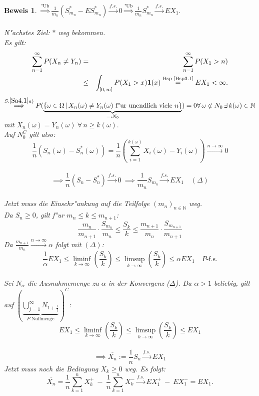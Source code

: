 \documentclass[a4paper,11pt]{scrbook}
\newcommand{\N}{{\mathbb N}}
\newcommand{\ind}{\text{\bf{1}}}
\def\folgt{\ensuremath{\implies}}
\def\fs{\stackrel{f.s.}{\rightarrow }}
\theoremstyle{nonumberplain}
\newtheorem{Bew}{Beweis}
\begin{document}
\begin{Bew}
$\stackrel{\text{"Ub}}{\Longrightarrow} \frac1{m_n} (S_{m_n}^{\ast}-ES_{m_n}^{\ast}) \fs 0 \stackrel{\text{"Ub}}{\Longrightarrow} \frac1{m_n} S_{m_n}^{\ast} \fs EX_1.$\\
\\
N"achstes Ziel: $\ast$ weg bekommen.\\
Es gilt:
\begin{eqnarray*}
\sum_{n=1}^{\infty} P(X_n \not= Y_n) & = & \sum_{n=1}^{\infty} P(X_1 > n) \\
& \leq & \int_{[0,\infty]} P(X_1>x) \ind(x) \stackrel{\text{Bsp \ref{Bsp3.1}}}{=} EX_1 < \infty.
\end{eqnarray*}
$\stackrel{S.\ref{Sa4.1} a)}{\Longrightarrow} P(\underbrace{\{ \omega \in \Omega \, | \, X_n(\omega) \not= Y_n(\omega) \text{ f"ur unendlich viele }n \}}_{=:N_0}) = 0\\
\forall\, \omega \not\in N_0\, \exists\, k(\omega) \in \N$ mit $X_n(\omega) = Y_n(\omega) \ \forall\, n \geq k(\omega).$\\
Auf $N_0^C$ gilt also: \\
$$\frac{1}{n}(S_n(\omega)-S_n^*(\omega)) = \frac{1}{n}(\sum_{i=1}^{k(\omega)}X_i(\omega)-Y_i(\omega))\stackrel{n\to\infty}{\to}0 $$\\$$
\folgt\frac{1}{n}(S_n-S_n^*)\fs 0\ \folgt\frac{1}{m_n}S_{m_n}\fs EX_1\quad(\Delta)$$ \\
Jetzt muss die Einschr"ankung auf die Teilfolge $(m_n)_{n\in\N}$ weg. \\
Da $S_n\geq0$, gilt f"ur $m_n\leq k\leq m_{n+1}$:
$$\frac{m_n}{m_{n+1}}\cdot\frac{S_{m_n}}{m_n} \leq \frac{S_k}{k} \leq \frac{m_{n+1}}{m_n}\cdot\frac{S_{m_{n+1}}}{m_{n+1}}$$
Da $\frac{m_{n+1}}{m_n}\stackrel{n\to\infty}{\to}\alpha$ folgt mit $(\Delta)$:
$$\frac{1}{\alpha}EX_1 \leq \liminf_{k\to\infty}(\frac{S_k}{k}) \leq \limsup_{k\to\infty}(\frac{S_k}{k}) \leq \alpha EX_1\quad P\text{-f.s.}$$ \\
Sei $N_\alpha$ die Ausnahmemenge zu $\alpha$ in der Konvergenz ($\Delta$). Da $\alpha > 1$ beliebig, gilt auf $(\underbrace{\bigcup_{j=1}^{\infty}N_{1+\frac{1}{j}}}_{P\text{-Nullmenge}})^C$:
$$EX_1 \leq \liminf_{k\to\infty}(\frac{S_k}{k}) \leq \limsup_{k\to\infty}(\frac{S_k}{k}) \leq EX_1 $$\\$$
\folgt \overline{X_n}:=\frac{1}{n}S_n\fs EX_1$$
Jetzt muss noch die Bedingung $X_k \geq 0$ weg. Es folgt:
$$\overline{X_n} = \frac{1}{n}\sum_{k=1}^n X_k^+\ - \ \frac{1}{n}\sum_{k=1}^n X_k^- \fs EX_1^+\ -\ EX_1^- = EX_1.$$\ 
\end{Bew}
\end{document}
